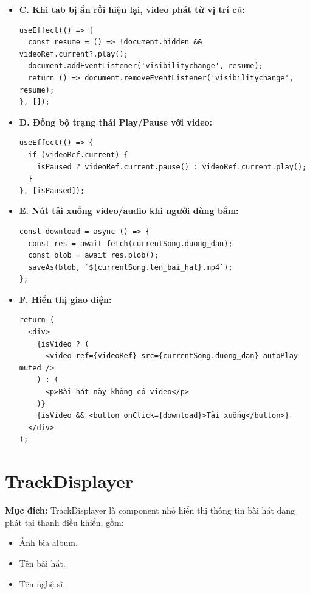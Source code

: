 \begin{enumerate}
\begin{itemize}
  \item \textbf{C. Khi tab bị ẩn rồi hiện lại, video phát từ vị trí cũ:}
\begin{verbatim}
useEffect(() => {
  const resume = () => !document.hidden && videoRef.current?.play();
  document.addEventListener('visibilitychange', resume);
  return () => document.removeEventListener('visibilitychange', resume);
}, []);
\end{verbatim}

  \item \textbf{D. Đồng bộ trạng thái Play/Pause với video:}
\begin{verbatim}
useEffect(() => {
  if (videoRef.current) {
    isPaused ? videoRef.current.pause() : videoRef.current.play();
  }
}, [isPaused]);
\end{verbatim}

  \item \textbf{E. Nút tải xuống video/audio khi người dùng bấm:}
\begin{verbatim}
const download = async () => {
  const res = await fetch(currentSong.duong_dan);
  const blob = await res.blob();
  saveAs(blob, `${currentSong.ten_bai_hat}.mp4`);
};
\end{verbatim}

  \item \textbf{F. Hiển thị giao diện:}
\begin{verbatim}
return (
  <div>
    {isVideo ? (
      <video ref={videoRef} src={currentSong.duong_dan} autoPlay muted />
    ) : (
      <p>Bài hát này không có video</p>
    )}
    {isVideo && <button onClick={download}>Tải xuống</button>}
  </div>
);
\end{verbatim}
\end{itemize}

\end{enumerate}


\section{TrackDisplayer}
\textbf{Mục đích:} TrackDisplayer là component nhỏ hiển thị thông tin bài hát đang phát tại thanh điều khiển, gồm:
\begin{itemize}
  \item Ảnh bìa album.
  \item Tên bài hát.
  \item Tên nghệ sĩ.
\end{itemize}

